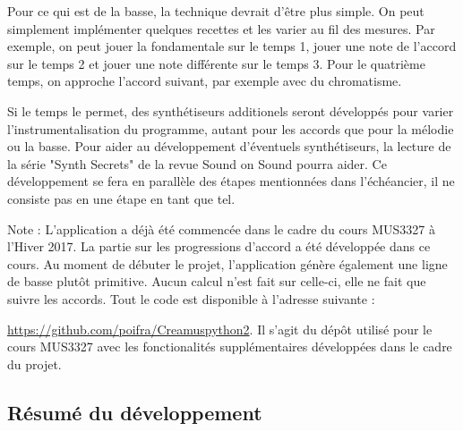 \documentclass[letterpaper,12pt]{scrartcl}
\begin{document}
Pour ce qui est de la basse, la technique devrait d'être plus simple. On peut simplement implémenter quelques recettes et les varier au fil des mesures. Par exemple, on peut jouer la fondamentale sur le temps 1, jouer une note de l'accord sur le temps 2 et jouer une note différente sur le temps 3. Pour le quatrième temps, on approche l'accord suivant, par exemple avec du chromatisme. 

Si le temps le permet, des synthétiseurs additionels seront développés pour varier l'instrumentalisation du programme, autant pour les accords que pour la mélodie ou la basse. Pour aider au développement d'éventuels synthétiseurs, la lecture de la série "Synth Secrets" de la revue Sound on Sound pourra aider. Ce développement se fera en parallèle des étapes mentionnées dans l'échéancier, il ne consiste pas en une étape en tant que tel. 

Note : L'application a déjà été commencée dans le cadre du cours MUS3327 à l'Hiver 2017. La partie sur les progressions d'accord a été développée dans ce cours. Au moment de débuter le projet, l'application génère également une ligne de basse plutôt primitive. Aucun calcul n'est fait sur celle-ci, elle ne fait que suivre les accords. Tout le code est disponible à l'adresse suivante : 

\href{https://github.com/poifra/Creamuspython2}{https://github.com/poifra/Creamuspython2}. Il s'agit du dépôt utilisé pour le cours MUS3327 avec les fonctionalités supplémentaires développées dans le cadre du projet.

	\subsection{Résumé du développement}
\end{document}

